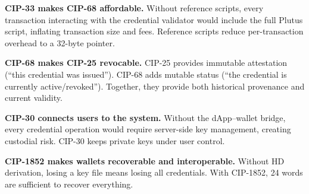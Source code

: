 \textbf{CIP-33 makes CIP-68 affordable.}  Without reference scripts, every
transaction interacting with the credential validator would include the full
Plutus script, inflating transaction size and fees.  Reference scripts reduce
per-transaction overhead to a 32-byte pointer.

\textbf{CIP-68 makes CIP-25 revocable.}  CIP-25 provides immutable
attestation (``this credential was issued'').  CIP-68 adds mutable status
(``the credential is currently active/revoked'').  Together, they provide
both historical provenance and current validity.

\textbf{CIP-30 connects users to the system.}  Without the dApp--wallet
bridge, every credential operation would require server-side key management,
creating custodial risk.  CIP-30 keeps private keys under user control.

\textbf{CIP-1852 makes wallets recoverable and interoperable.}  Without
HD derivation, losing a key file means losing all credentials.  With
CIP-1852, 24 words are sufficient to recover everything.

